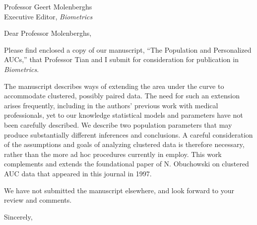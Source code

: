 \documentclass[10pt]{letter}
\begin{document}

\begin{letter}{Professor Geert Molenberghs  \\ Executive Editor, \emph{Biometrics} } %


\opening{Dear Professor Molenberghs,}

Please find enclosed a copy of our manuscript, ``The Population and Personalized AUCs,'' that
Professor Tian and I submit
for consideration for publication in \emph{Biometrics}.

The manuscript describes ways of extending the area under the curve to
accommodate clustered, possibly paired data. The need for such an
extension arises frequently, including in the authors' previous work with medical professionals,
yet to our knowledge statistical models and parameters have not been
carefully described. We describe two population parameters that may
produce substantially different inferences and conclusions. A careful
consideration of the assumptions and goals of analyzing clustered data
is therefore necessary, rather than the more ad hoc procedures
currently in employ. This work complements and extends the
foundational paper of N. Obuchowski on clustered AUC data that appeared in this journal in
1997.

We have not submitted the manuscript elsewhere, and look forward to your review and
comments.

\vspace{2\parskip} %
\closing{Sincerely,}


\end{letter}
\end{document}
